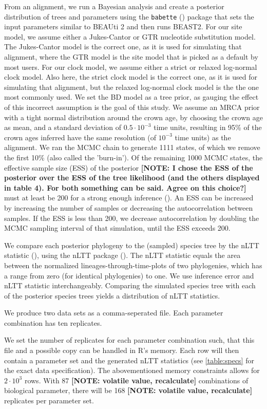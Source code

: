 \documentclass{article}
\begin{document}
From an alignment, we run a Bayesian analysis and 
create a posterior distribution of trees and parameters
using the \verb;babette; (\cite{babette}) package
that sets the input parameters similar to BEAUti 2 and then runs BEAST2. 
For our site model, we assume either a Jukes-Cantor or GTR nucleotide substitution model.
The Jukes-Cantor model is the correct one, as it is used for simulating that alignment,
where the GTR model is the site model that is picked as a default by most users.
For our clock model, we assume either a strict or relaxed log-normal 
clock model. 
Also here, the strict clock model is the correct one, as it is used for simulating that alignment,
but the relaxed log-normal clock model is the the one most commonly used.
We set the BD model as a tree prior, 
as gauging the effect of this incorrect assumption is the goal of this study. 
We assume an MRCA prior with a tight normal distribution
around the crown age, by choosing the crown age as mean, and a standard deviation 
of $0.5 \cdot 10^{-3}$ time units,
resulting in 95\% of the crown ages inferred have the same resolution (of $10^{-3}$ time 
units) as the alignment. 
We ran the MCMC chain to generate 1111 states,
of which we remove the first 10\% (also called the 'burn-in'). 
Of the remaining
1000 MCMC states, the effective sample size (ESS) of the posterior \textbf{[NOTE: I chose 
the ESS of the posterior over the ESS of the tree likelihood (and the 
others displayed in table 4). For both something can be said. Agree on this choice?]} must at least be 200
for a strong enough inference (\cite{beastbook}). An ESS can be increased by increasing
the number of samples or decreasing the autocorrelation between samples. 
If the ESS is less than 200, we decrease autocorrelation by doubling 
the MCMC sampling interval of that simulation, until the ESS exceeds 200.

We compare each posterior phylogeny to the (sampled) species tree
by the nLTT statistic (\cite{janzen2015}), using the nLTT package (\cite{nltt}). 
The nLTT statistic equals the area between the normalized
lineages-through-time-plots of two phylogenies, which has a range 
from zero (for identical phylogenies) to one. We use inference error 
and nLTT statistic interchangeably. Comparing the simulated species tree
with each of the posterior species trees yields a distribution of nLTT statistics. 

We produce two data sets as a comma-seperated file.
Each parameter combination has ten replicates. 

We set the number of replicates for each parameter combination such,
that this file and a possible copy can be handled in R's memory.
Each row will then contain a parameter set and the generated nLTT 
statistics (see \ref{table:specs} for the exact data specification).
The abovementioned memory constraints allows for $2 \cdot 10^3$ rows. 
With 87 \textbf{[NOTE: volatile value, recalculate]} combinations of biological parameter, there will be 
168 \textbf{[NOTE: volatile value, recalculate]} replicates per parameter set.
\end{document}

